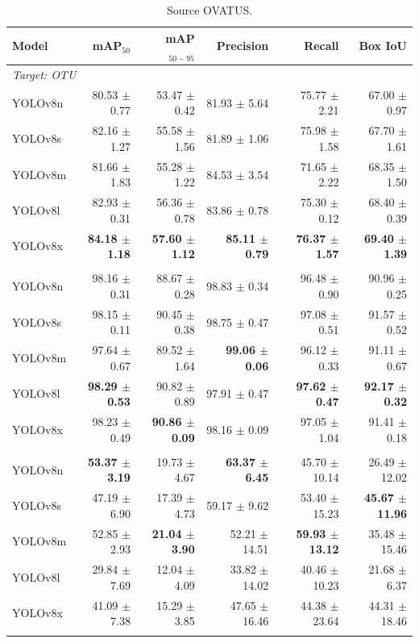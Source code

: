 \documentclass[10pt]{article}
\begin{document}
\begin{table}[t]
\centering
\small
\caption{Source OVATUS.}
\label{tab:yolo_src_ovatus}
\begin{tabular}{lrrrrr}
\toprule
Model & mAP$_{50}$ & mAP$_{50-95}$ & Precision & Recall & Box IoU \\
\midrule
\multicolumn{6}{l}{\textit{Target: OTU}} \\
YOLOv8n & 80.53 $\pm$ 0.77 & 53.47 $\pm$ 0.42 & 81.93 $\pm$ 5.64 & 75.77 $\pm$ 2.21 & 67.00 $\pm$ 0.97 \\
YOLOv8s & 82.16 $\pm$ 1.27 & 55.58 $\pm$ 1.56 & 81.89 $\pm$ 1.06 & 75.98 $\pm$ 1.58 & 67.70 $\pm$ 1.61 \\
YOLOv8m & 81.66 $\pm$ 1.83 & 55.28 $\pm$ 1.22 & 84.53 $\pm$ 3.54 & 71.65 $\pm$ 2.22 & 68.35 $\pm$ 1.50 \\
YOLOv8l & 82.93 $\pm$ 0.31 & 56.36 $\pm$ 0.78 & 83.86 $\pm$ 0.78 & 75.30 $\pm$ 0.12 & 68.40 $\pm$ 0.39 \\
YOLOv8x & \textbf{84.18 $\pm$ 1.18} & \textbf{57.60 $\pm$ 1.12} & \textbf{85.11 $\pm$ 0.79} & \textbf{76.37 $\pm$ 1.57} & \textbf{69.40 $\pm$ 1.39} \\
\addlinespace[2pt]
\multicolumn{6}{l}{\textit{Target: OVATUS}} \\
YOLOv8n & 98.16 $\pm$ 0.31 & 88.67 $\pm$ 0.28 & 98.83 $\pm$ 0.34 & 96.48 $\pm$ 0.90 & 90.96 $\pm$ 0.25 \\
YOLOv8s & 98.15 $\pm$ 0.11 & 90.45 $\pm$ 0.38 & 98.75 $\pm$ 0.47 & 97.08 $\pm$ 0.51 & 91.57 $\pm$ 0.52 \\
YOLOv8m & 97.64 $\pm$ 0.67 & 89.52 $\pm$ 1.64 & \textbf{99.06 $\pm$ 0.06} & 96.12 $\pm$ 0.33 & 91.11 $\pm$ 0.67 \\
YOLOv8l & \textbf{98.29 $\pm$ 0.53} & 90.82 $\pm$ 0.89 & 97.91 $\pm$ 0.47 & \textbf{97.62 $\pm$ 0.47} & \textbf{92.17 $\pm$ 0.32} \\
YOLOv8x & 98.23 $\pm$ 0.49 & \textbf{90.86 $\pm$ 0.09} & 98.16 $\pm$ 0.09 & 97.05 $\pm$ 1.04 & 91.41 $\pm$ 0.18 \\
\addlinespace[2pt]
\multicolumn{6}{l}{\textit{Target: USOVA}} \\
YOLOv8n & \textbf{53.37 $\pm$ 3.19} & 19.73 $\pm$ 4.67 & \textbf{63.37 $\pm$ 6.45} & 45.70 $\pm$ 10.14 & 26.49 $\pm$ 12.02 \\
YOLOv8s & 47.19 $\pm$ 6.90 & 17.39 $\pm$ 4.73 & 59.17 $\pm$ 9.62 & 53.40 $\pm$ 15.23 & \textbf{45.67 $\pm$ 11.96} \\
YOLOv8m & 52.85 $\pm$ 2.93 & \textbf{21.04 $\pm$ 3.90} & 52.21 $\pm$ 14.51 & \textbf{59.93 $\pm$ 13.12} & 35.48 $\pm$ 15.46 \\
YOLOv8l & 29.84 $\pm$ 7.69 & 12.04 $\pm$ 4.09 & 33.82 $\pm$ 14.02 & 40.46 $\pm$ 10.23 & 21.68 $\pm$ 6.37 \\
YOLOv8x & 41.09 $\pm$ 7.38 & 15.29 $\pm$ 3.85 & 47.65 $\pm$ 16.46 & 44.38 $\pm$ 23.64 & 44.31 $\pm$ 18.46 \\
\addlinespace[2pt]
\bottomrule
\end{tabular}
\end{table}
\end{document}
